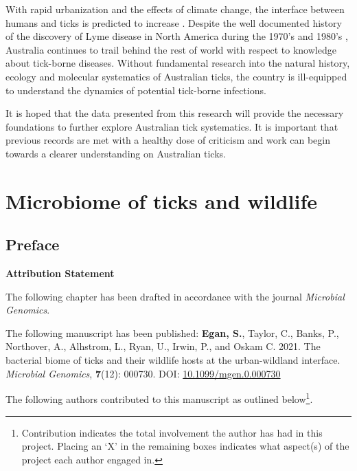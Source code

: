 \documentclass[a4paper, nobind]{templates/ociamthesis}
\renewcommand{\chaptermark}[1]{\markboth{\thechapter. #1}{\thechapter. #1}}
\begin{document}
With rapid urbanization and the effects of climate change, the interface between humans and ticks is predicted to increase \autocite{gilbertImpactsClimateChange2021}.
Despite the well documented history of the discovery of Lyme disease in North America during the 1970's and 1980's \autocite{ostfeldFunctionBiodiversityEcology2000}, Australia continues to trail behind the rest of world with respect to knowledge about tick-borne diseases.
Without fundamental research into the natural history, ecology and molecular systematics of Australian ticks, the country is ill-equipped to understand the dynamics of potential tick-borne infections.

It is hoped that the data presented from this research will provide the necessary foundations to further explore Australian tick systematics.
It is important that previous records are met with a healthy dose of criticism and work can begin towards a clearer understanding on Australian ticks.

\hypertarget{wildlife-bacteria}{%
\chapter{Microbiome of ticks and wildlife}\label{wildlife-bacteria}}

\chaptermark{Wildlife biome}

\newpage

\hypertarget{preface-2}{%
\section*{Preface}\label{preface-2}}

\textbf{Attribution Statement}

The following chapter has been drafted in accordance with the journal \emph{Microbial Genomics}.

The following manuscript has been published: \textbf{Egan, S.}, Taylor, C., Banks, P., Northover, A., Alhstrom, L., Ryan, U., Irwin, P., and Oskam C. 2021. The bacterial biome of ticks and their wildlife hosts at the urban-wildland interface. \emph{Microbial Genomics}, \textbf{7}(12): 000730. DOI: \href{https://doi.org/10.1099/mgen.0.000730}{10.1099/mgen.0.000730}

The following authors contributed to this manuscript as outlined below\footnote{Contribution indicates the total involvement the author has had in this project. Placing an `X' in the remaining boxes indicates what aspect(s) of the project each author engaged in.}.
\end{document}

